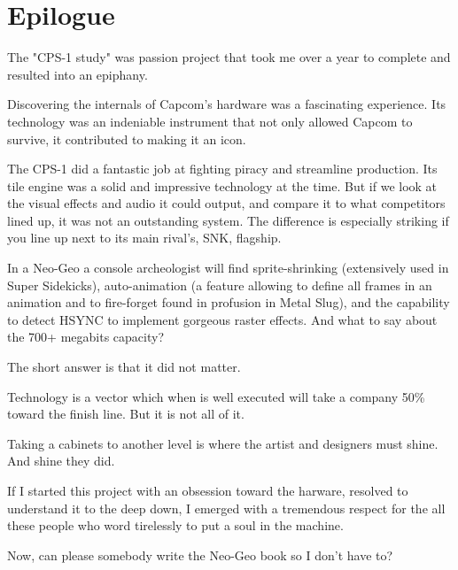 \chapter{Epilogue} 

The "CPS-1 study" was passion project that took me over a year to complete and resulted into an epiphany.

Discovering the internals of Capcom's hardware was a fascinating experience. Its technology was an indeniable instrument that not only allowed Capcom to survive, it contributed to making it an icon. 

The CPS-1 did a fantastic job
at fighting piracy and streamline production. Its tile engine was a solid and impressive technology at the time. But if we look at the visual effects and audio it could output, and compare it to what competitors lined up, it was not an outstanding system. The difference is especially striking if you line up next to its main rival's, SNK, flagship. 

In a Neo-Geo a console archeologist will find sprite-shrinking (extensively used in Super Sidekicks),
auto-animation (a feature allowing to define all frames in an animation and to fire-forget found in profusion in Metal Slug), and
the capability to detect HSYNC to implement gorgeous raster effects. And what to say about the 700+ megabits capacity?

The short answer is that it did not matter.

Technology is a vector which when is well executed will take a company 50\% toward the finish line. But it is not all of it.

Taking a cabinets to another level is where the artist and designers must shine. And shine they did. 

If I started this project with an obsession toward the harware, resolved to understand it to the deep down, I emerged with a tremendous respect for the all these people who word tirelessly to put a soul in the machine. 

Now, can please somebody write the Neo-Geo book so I don't have to?
